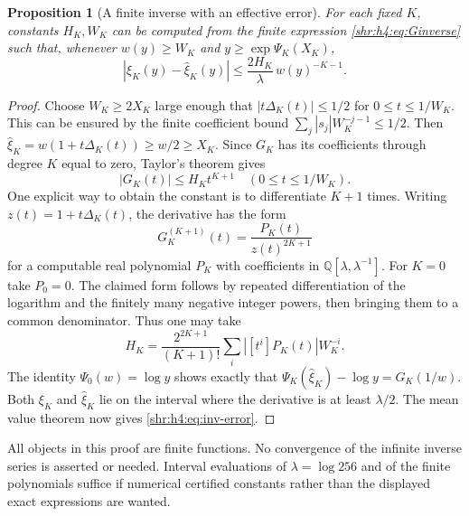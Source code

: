 \documentclass[11pt,letterpaper]{article}
\numberwithin{equation}{section}
\newtheorem{proposition}[theorem]{Proposition}
\theoremstyle{definition}
\newcommand{\Q}{\mathbb Q}
\newcommand{\1}{\mathbf 1}
\begin{document}
\begin{proposition}[A finite inverse with an effective error]
\label{shr:h4:prop:inverse}
For each fixed $K$, constants $H_K,W_K$ can be computed from the finite
expression \eqref{shr:h4:eq:Ginverse} such that, whenever $w(y)\ge W_K$ and
$y\ge\exp\Psi_K(X_K)$,
\begin{equation}
 |\xi_K(y)-\widehat\xi_K(y)|
 \le\frac{2H_K}{\lambda}\,w(y)^{-K-1}.
 \label{shr:h4:eq:inv-error}
\end{equation}
\end{proposition}
\begin{proof}
Choose $W_K\ge2X_K$ large enough that
$|t\Delta_K(t)|\le1/2$ for $0\le t\le1/W_K$. This can be ensured by
the finite coefficient bound
$\sum_j|s_j|W_K^{-j-1}\le1/2$. Then
$\widehat\xi_K=w(1+t\Delta_K(t))\ge w/2\ge X_K$.
Since $G_K$ has its coefficients through degree $K$ equal to zero,
Taylor's theorem gives
\[
 |G_K(t)|\le H_Kt^{K+1}\quad(0\le t\le1/W_K).
\]
One explicit way to obtain the constant is to differentiate $K+1$ times.
Writing $z(t)=1+t\Delta_K(t)$, the derivative has the form
\[
 G_K^{(K+1)}(t)=\frac{P_K(t)}{z(t)^{2K+1}}
\]
for a computable real polynomial $P_K$ with coefficients in
$\Q[\lambda,\lambda^{-1}]$. For $K=0$ take $P_0=0$.
The claimed form follows by repeated differentiation of the logarithm
and the finitely many negative integer powers, then bringing them to a
common denominator. Thus one may take
\begin{equation}
 H_K=\frac{2^{2K+1}}{(K+1)!}
       \sum_i|[t^i]P_K(t)|W_K^{-i}.
 \label{shr:h4:eq:HK}
\end{equation}
The identity $\Psi_0(w)=\log y$ shows exactly that
$\Psi_K(\widehat\xi_K)-\log y=G_K(1/w)$.
Both $\xi_K$ and $\widehat\xi_K$ lie on the interval where the derivative
is at least $\lambda/2$. The mean value theorem now gives
\eqref{shr:h4:eq:inv-error}.
\end{proof}

All objects in this proof are finite functions. No convergence of the
infinite inverse series is asserted or needed. Interval evaluations of
$\lambda=\log256$ and of the finite polynomials suffice if numerical
certified constants rather than the displayed exact expressions are
wanted.
\end{document}
